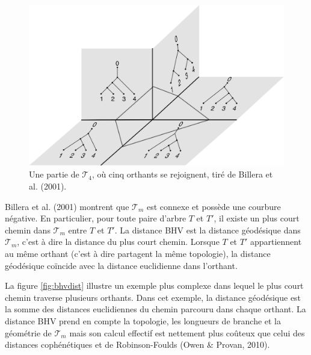 \documentclass[12pt,a4paper]{reedthesis}
\theoremstyle{definition}
\theoremstyle{definition}
\theoremstyle{definition}
\theoremstyle{remark}
\begin{document}
\begin{figure}

{\centering \includegraphics[width=0.9\linewidth]{img/bhv_orthants} 

}

\caption{Une partie de \(\mathscr{T}_4\), où cinq orthants se rejoignent, tiré de Billera et al. (2001).}\label{fig:bhvorthants}
\end{figure}
Billera et al. (2001) montrent que \(\mathscr{T}_m\) est connexe et possède une courbure négative. En particulier, pour toute paire d'arbre \(T\) et \(T'\), il existe un plus court chemin dans \(\mathscr{T}_m\) entre \(T\) et \(T'\). La distance BHV est la distance géodésique dans \(\mathscr{T}_m\), c'est à dire la distance du plus court chemin. Lorsque \(T\) et \(T'\) appartiennent au même orthant (c'est à dire partagent la même topologie), la distance géodésique coïncide avec la distance euclidienne dans l'orthant.

La figure \ref{fig:bhvdist} illustre un exemple plus complexe dans lequel le plus court chemin traverse plusieurs orthants. Dans cet exemple, la distance géodésique est la somme des distances euclidiennes du chemin parcouru dans chaque orthant. La distance BHV prend en compte la topologie, les longueurs de branche et la géométrie de \(\mathscr{T}_m\) mais son calcul effectif est nettement plus coûteux que celui des distances cophénétiques et de Robinson-Foulds (Owen \& Provan, 2010).
\end{document}
